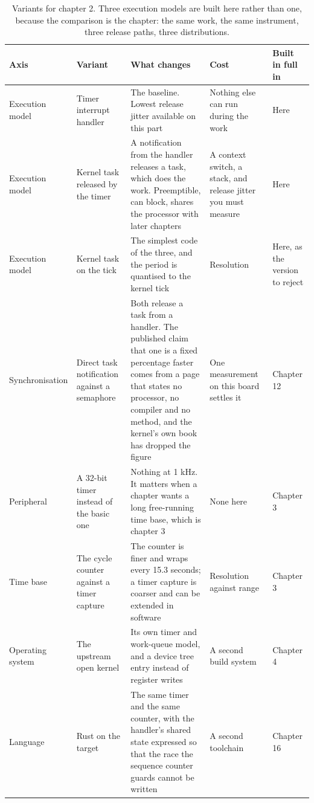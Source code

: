 \begin{table}[H]\centering\small
\begin{tabular}{p{24mm}p{26mm}p{44mm}p{22mm}p{20mm}}
\toprule
Axis & Variant & What changes & Cost & Built in full in \\
\midrule
Execution model & Timer interrupt handler & The baseline. Lowest release jitter available on this part & Nothing else can run during the work & Here \\
Execution model & Kernel task released by the timer & A notification from the handler releases a task, which does the work. Preemptible, can block, shares the processor with later chapters & A context switch, a stack, and release jitter you must measure & Here \\
Execution model & Kernel task on the tick & The simplest code of the three, and the period is quantised to the kernel tick & Resolution & Here, as the version to reject \\
Synchronisation & Direct task notification against a semaphore & Both release a task from a handler. The published claim that one is a fixed percentage faster comes from a page that states no processor, no compiler and no method, and the kernel's own book has dropped the figure & One measurement on this board settles it & Chapter 12 \\
Peripheral & A 32-bit timer instead of the basic one & Nothing at 1 kHz. It matters when a chapter wants a long free-running time base, which is chapter 3 & None here & Chapter 3 \\
Time base & The cycle counter against a timer capture & The counter is finer and wraps every 15.3 seconds; a timer capture is coarser and can be extended in software & Resolution against range & Chapter 3 \\
Operating system & The upstream open kernel & Its own timer and work-queue model, and a device tree entry instead of register writes & A second build system & Chapter 4 \\
Language & Rust on the target & The same timer and the same counter, with the handler's shared state expressed so that the race the sequence counter guards cannot be written & A second toolchain & Chapter 16 \\
\bottomrule
\end{tabular}
\caption{Variants for chapter 2. Three execution models are built here rather than one, because the comparison is the chapter: the same work, the same instrument, three release paths, three distributions.}
\end{table}

